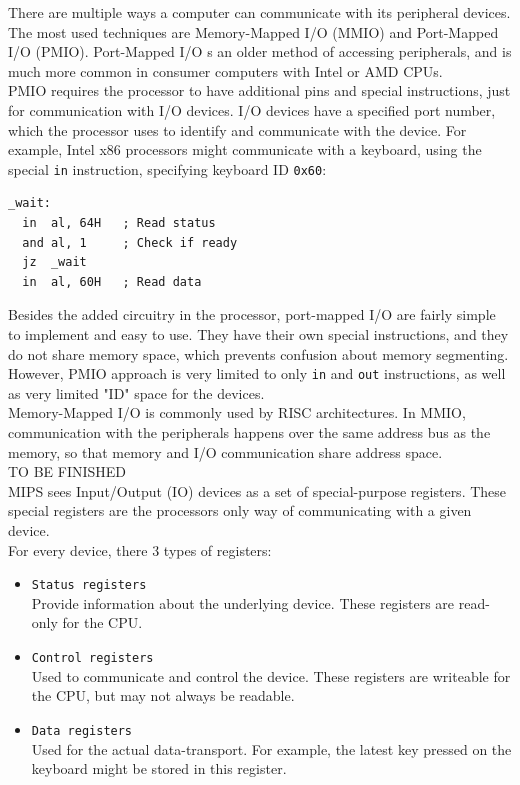 There are multiple ways a computer can communicate with its peripheral devices.
The most used techniques are Memory-Mapped I/O (MMIO) and Port-Mapped I/O
(PMIO). Port-Mapped I/O s an older method of accessing peripherals, and is much
more common in consumer computers with Intel or AMD CPUs\cite{intelmanual}.\\
PMIO requires the processor to have additional pins and special instructions,
just for communication with I/O devices. I/O devices have a specified port
number, which the processor uses to identify and communicate with the device.
For example, Intel x86 processors might communicate with a keyboard, using the
special \texttt{in} instruction, specifying keyboard ID
\texttt{0x60}\cite{intel:pch}\cite{osdev:io_ports}:
\begin{lstlisting}[language={[x86masm]Assembler}]
_wait:
  in  al, 64H	; Read status
  and al, 1		; Check if ready
  jz  _wait
  in  al, 60H	; Read data
\end{lstlisting}
Besides the added circuitry in the processor, port-mapped I/O are fairly
simple to implement and easy to use. They have their own special instructions,
and they do not share memory space, which prevents confusion about
memory segmenting.
However, PMIO approach is very limited to only \texttt{in} and \texttt{out}
instructions, as well as very limited "ID" space for the devices.\\

Memory-Mapped I/O is commonly used by RISC architectures. In MMIO,
communication with the peripherals happens over the same address bus as the
memory, so that memory and I/O communication share address space.
\\
TO BE FINISHED
\\


MIPS sees Input/Output (IO) devices as a set of special-purpose registers. These
special registers are the processors only way of communicating with a given
device.\\
For every device, there 3 types of registers\cite{cs_uwm:memory_mapped_io}:
\begin{itemize}
	\item \texttt{Status registers}\\
	Provide information about the underlying device. These registers are
	read-only for the CPU.

	\item \texttt{Control registers}\\
	Used to communicate and control the device. These registers are
	writeable for the CPU, but may not always be readable.

	\item \texttt{Data registers}\\
	Used for the actual data-transport. For example, the latest key pressed
	on the keyboard might be stored in this register.
\end{itemize}

